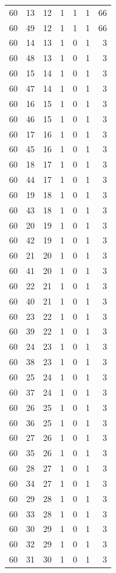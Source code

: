 \begin{longtable}{rrrrrrr}
60 & 13 & 12 & 1 & 1 & 1 & 66\\
60 & 49 & 12 & 1 & 1 & 1 & 66\\
60 & 14 & 13 & 1 & 0 & 1 & 3\\
60 & 48 & 13 & 1 & 0 & 1 & 3\\
60 & 15 & 14 & 1 & 0 & 1 & 3\\
60 & 47 & 14 & 1 & 0 & 1 & 3\\
60 & 16 & 15 & 1 & 0 & 1 & 3\\
60 & 46 & 15 & 1 & 0 & 1 & 3\\
60 & 17 & 16 & 1 & 0 & 1 & 3\\
60 & 45 & 16 & 1 & 0 & 1 & 3\\
60 & 18 & 17 & 1 & 0 & 1 & 3\\
60 & 44 & 17 & 1 & 0 & 1 & 3\\
60 & 19 & 18 & 1 & 0 & 1 & 3\\
60 & 43 & 18 & 1 & 0 & 1 & 3\\
60 & 20 & 19 & 1 & 0 & 1 & 3\\
60 & 42 & 19 & 1 & 0 & 1 & 3\\
60 & 21 & 20 & 1 & 0 & 1 & 3\\
60 & 41 & 20 & 1 & 0 & 1 & 3\\
60 & 22 & 21 & 1 & 0 & 1 & 3\\
60 & 40 & 21 & 1 & 0 & 1 & 3\\
60 & 23 & 22 & 1 & 0 & 1 & 3\\
60 & 39 & 22 & 1 & 0 & 1 & 3\\
60 & 24 & 23 & 1 & 0 & 1 & 3\\
60 & 38 & 23 & 1 & 0 & 1 & 3\\
60 & 25 & 24 & 1 & 0 & 1 & 3\\
60 & 37 & 24 & 1 & 0 & 1 & 3\\
60 & 26 & 25 & 1 & 0 & 1 & 3\\
60 & 36 & 25 & 1 & 0 & 1 & 3\\
60 & 27 & 26 & 1 & 0 & 1 & 3\\
60 & 35 & 26 & 1 & 0 & 1 & 3\\
60 & 28 & 27 & 1 & 0 & 1 & 3\\
60 & 34 & 27 & 1 & 0 & 1 & 3\\
60 & 29 & 28 & 1 & 0 & 1 & 3\\
60 & 33 & 28 & 1 & 0 & 1 & 3\\
60 & 30 & 29 & 1 & 0 & 1 & 3\\
60 & 32 & 29 & 1 & 0 & 1 & 3\\
60 & 31 & 30 & 1 & 0 & 1 & 3\\
\end{longtable}
